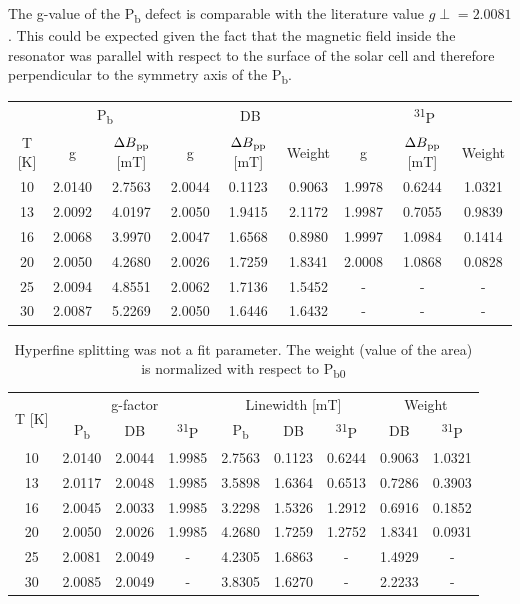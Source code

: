 \documentclass[a4paper]{book}
\begin{document}
	The g-value of the P\textsubscript{b} defect is comparable with the literature value $g\perp = 2.0081$. This could be expected given the fact that the magnetic field inside the resonator was parallel with respect to the surface of the solar cell and therefore perpendicular to the symmetry axis of the P\textsubscript{b}.\\
	
	\begin{table}

		\begin{tabular}{c|c|c|c|c|c|c|c|c}
				&	\multicolumn{2}{c|}{P\textsubscript{b}} & \multicolumn{3}{|c|}{DB} & \multicolumn{3}{|c}{\textsuperscript{31}P} \\
			T [K]	& g & $\Delta B\textsubscript{pp}$ [mT] & g & $\Delta B\textsubscript{pp}$[mT] & Weight & g & $\Delta B\textsubscript{pp}$ [mT] & Weight \\
			\hline
			10& 2.0140	&2.7563	&2.0044	&0.1123	&0.9063	&1.9978	& 0.6244 & 1.0321 \\
			13&	2.0092&	4.0197	&2.0050	&1.9415	&2.1172	&1.9987  & 0.7055 & 0.9839\\
			16&	2.0068&	3.9970& 2.0047	&1.6568	&0.8980	&1.9997	&1.0984  &0.1414 \\
			20&	2.0050& 4.2680	&2.0026	&1.7259	&1.8341	&2.0008	&1.0868  &0.0828 \\
			25& 2.0094	&4.8551	&2.0062	&1.7136	&1.5452	&	-& - & -\\
			30& 2.0087	&5.2269	&2.0050	&1.6446	&1.6432	&	-&-  & -\\
		\end{tabular}
	\end{table}
	\fi
	\begin{table}
		\centering
		\small
		\begin{tabular}{c|c|c|c|c|c|c|c|c}
			\multirow{2}{*}{T [K]} &	\multicolumn{3}{c|}{g-factor} & \multicolumn{3}{|c|}{Linewidth [mT]} & \multicolumn{2}{|c}{Weight} \\
				& P\textsubscript{b} & DB & \textsuperscript{31}P & P\textsubscript{b} & DB & \textsuperscript{31}P & DB & \textsuperscript{31}P \\
			\hline
				10& 2.0140	&2.0044		&1.9985		&2.7563		&0.1123		& 0.6244 	&0.9063  & 1.0321 \\
				13& 2.0117	&2.0048		&1.9985		&3.5898		&1.6364		& 0.6513	&0.7286	 & 0.3903\\
				16& 2.0045	&2.0033		&1.9985		&3.2298		&1.5326		&1.2912  	&0.6916	 &0.1852 \\
				20& 2.0050	&2.0026		&1.9985		&4.2680		&1.7259		&1.2752  	&1.8341	 &0.0931 \\
				25& 2.0081	&2.0049		&  -   		&4.2305		&1.6863		& - 		&1.4929  & - \\
				30& 2.0085	&2.0049		&  -   		&3.8305		&1.6270		& - 		&2.2233  & - \\
		\end{tabular}
	\caption{Hyperfine splitting was not a fit parameter. The weight (value of the area) is normalized with respect to P\textsubscript{b0}}
	\label{tab:summer21_bestfit}
	\end{table}
\end{document}
